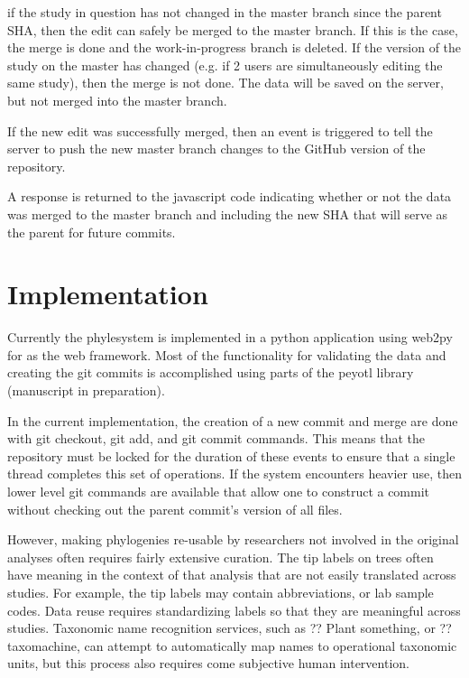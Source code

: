 \documentclass[a4paper,10pt]{article}
\newcommand{\ps}{phylesystem\xspace}
\begin{document}
\begin{compactenum}
    \item if the study in question has not changed in the master branch since the parent SHA, then the edit can safely be merged to the master branch.
        If this is the case, the merge is done and the work-in-progress branch is deleted.
        If the version of the study on the master has changed (e.g. if 2 users are simultaneously editing the same study),
        then the merge is not done. The data will be saved on the server, but not merged into the master branch.
    \item If the new edit was successfully merged, then an event is triggered to tell the server to push the new master branch changes to the GitHub version
        of the repository.
    \item A response is returned to the javascript code indicating whether or not the data was 
        merged to the master branch and including the new SHA that will serve as the parent for future commits.
    \end{compactenum}
\section{Implementation}
Currently the \ps is implemented in a python application using web2py for as the web framework.
Most of the functionality for validating the data and creating the git commits is accomplished using
    parts of the peyotl library (manuscript in preparation).

In the current implementation, the creation of a new commit and merge are done with git checkout, git add, and git commit commands.
This means that the repository must be locked for the duration of these events to ensure that a single thread completes this set of operations.
If the system encounters heavier use, then lower level git commands are available that allow one to construct a commit without checking out
the parent commit's version of all files.

However, making phylogenies re-usable by researchers not involved in the original analyses often requires fairly extensive curation.
The tip labels on trees often have meaning in the context of that analysis that are not easily translated across studies. 
For example, the tip labels may contain abbreviations, or lab sample codes.
Data reuse requires standardizing labels so that they are meaningful across studies.
Taxonomic name recognition services, such as ?? Plant something, or ?? taxomachine, can attempt to automatically map names to
operational taxonomic units, but this process also requires come subjective human intervention. 
\end{document}
